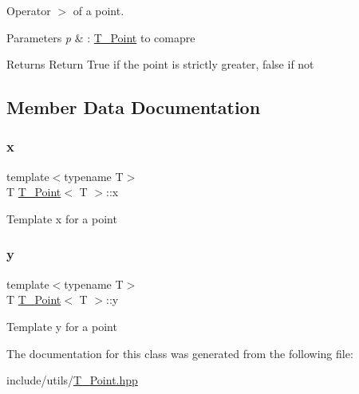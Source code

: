 Operator $>$ of a point. 


\begin{DoxyParams}{Parameters}
{\em p} & \+: \hyperlink{classT__Point}{T\+\_\+\+Point} to comapre \\
\hline
\end{DoxyParams}
\begin{DoxyReturn}{Returns}
Return True if the point is strictly greater, false if not 
\end{DoxyReturn}


\subsection{Member Data Documentation}
\mbox{\label{classT__Point_a45cc1c670a8d9bc786a38428cdce4bd2}} 
\subsubsection{\texorpdfstring{x}{x}}
{\footnotesize\ttfamily template$<$typename T$>$ \\
T \hyperlink{classT__Point}{T\+\_\+\+Point}$<$ T $>$\+::x}

Template x for a point \mbox{\label{classT__Point_a28da35a974844bdb3509a90345d3c1f9}} 
\subsubsection{\texorpdfstring{y}{y}}
{\footnotesize\ttfamily template$<$typename T$>$ \\
T \hyperlink{classT__Point}{T\+\_\+\+Point}$<$ T $>$\+::y}

Template y for a point 

The documentation for this class was generated from the following file\+:\begin{DoxyCompactItemize}
\item 
include/utils/\hyperlink{T__Point_8hpp}{T\+\_\+\+Point.\+hpp}\end{DoxyCompactItemize}
